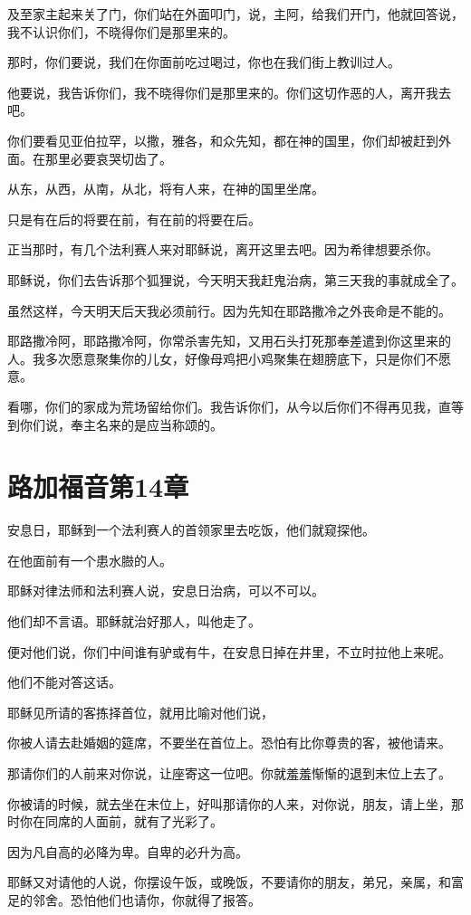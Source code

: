 \documentclass[12pt,oneside]{book}
\begin{document}
及至家主起来关了门，你们站在外面叩门，说，主阿，给我们开门，他就回答说，我不认识你们，不晓得你们是那里来的。

那时，你们要说，我们在你面前吃过喝过，你也在我们街上教训过人。

他要说，我告诉你们，我不晓得你们是那里来的。你们这切作恶的人，离开我去吧。

你们要看见亚伯拉罕，以撒，雅各，和众先知，都在神的国里，你们却被赶到外面。在那里必要哀哭切齿了。

从东，从西，从南，从北，将有人来，在神的国里坐席。

只是有在后的将要在前，有在前的将要在后。

正当那时，有几个法利赛人来对耶稣说，离开这里去吧。因为希律想要杀你。

耶稣说，你们去告诉那个狐狸说，今天明天我赶鬼治病，第三天我的事就成全了。

虽然这样，今天明天后天我必须前行。因为先知在耶路撒冷之外丧命是不能的。

耶路撒冷阿，耶路撒冷阿，你常杀害先知，又用石头打死那奉差遣到你这里来的人。我多次愿意聚集你的儿女，好像母鸡把小鸡聚集在翅膀底下，只是你们不愿意。

看哪，你们的家成为荒场留给你们。我告诉你们，从今以后你们不得再见我，直等到你们说，奉主名来的是应当称颂的。

\chapter{路加福音第14章}
安息日，耶稣到一个法利赛人的首领家里去吃饭，他们就窥探他。

在他面前有一个患水臌的人。

耶稣对律法师和法利赛人说，安息日治病，可以不可以。

他们却不言语。耶稣就治好那人，叫他走了。

便对他们说，你们中间谁有驴或有牛，在安息日掉在井里，不立时拉他上来呢。

他们不能对答这话。

耶稣见所请的客拣择首位，就用比喻对他们说，

你被人请去赴婚姻的筵席，不要坐在首位上。恐怕有比你尊贵的客，被他请来。

那请你们的人前来对你说，让座寄这一位吧。你就羞羞惭惭的退到末位上去了。

你被请的时候，就去坐在末位上，好叫那请你的人来，对你说，朋友，请上坐，那时你在同席的人面前，就有了光彩了。

因为凡自高的必降为卑。自卑的必升为高。

耶稣又对请他的人说，你摆设午饭，或晚饭，不要请你的朋友，弟兄，亲属，和富足的邻舍。恐怕他们也请你，你就得了报答。
\end{document}
